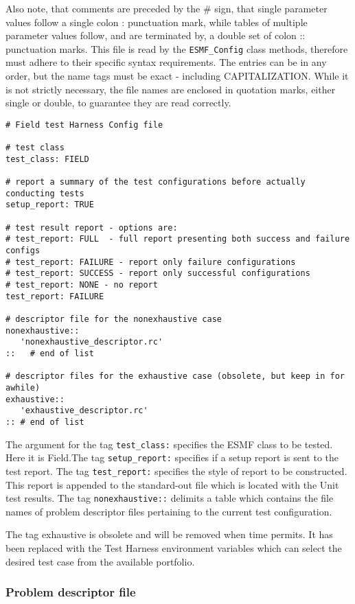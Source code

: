 Also note, that comments are preceded by the {\#} sign, that single parameter values follow 
a single colon {:} punctuation mark, while tables of multiple parameter values follow, 
and are terminated by, a double set of colon {::} punctuation marks.  
This file is read by the \texttt{ESMF\_Config} class methods, therefore must adhere 
to their specific syntax requirements. 
The entries can be in any order, but the name tags must be exact - including CAPITALIZATION. 
While it is not strictly necessary, the file names are enclosed in quotation marks, 
either single or double, to guarantee they are read correctly.
\begin{verbatim}
# Field test Harness Config file

# test class
test_class: FIELD 

# report a summary of the test configurations before actually conducting tests
setup_report: TRUE

# test result report - options are:
# test_report: FULL  - full report presenting both success and failure configs
# test_report: FAILURE - report only failure configurations
# test_report: SUCCESS - report only successful configurations
# test_report: NONE - no report
test_report: FAILURE

# descriptor file for the nonexhaustive case
nonexhaustive::
   'nonexhaustive_descriptor.rc'
::   # end of list

# descriptor files for the exhaustive case (obsolete, but keep in for awhile)
exhaustive::
   'exhaustive_descriptor.rc'
:: # end of list
\end{verbatim}

The argument for the tag \texttt{test\_class:} specifies the ESMF class to be tested. 
Here it is Field.The tag  \texttt{setup\_report:} specifies if a setup report is sent to the test report. 
The tag  \texttt{test\_report:} specifies the style of report to be constructed. 
This report is appended to the standard-out file which is located with the Unit test results. 
The tag \texttt{nonexhaustive::} delimits a table which contains the file names of 
problem descriptor files pertaining to the current test configuration. 

The tag exhaustive is obsolete and will be removed when time permits.  It has been replaced with the Test Harness
environment variables which can select the desired test case from the available portfolio.

\subsubsection{Problem descriptor file}
\label{sec:harness_problemdescriptorfile}

